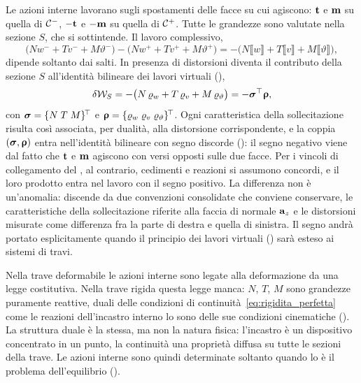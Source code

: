 Le azioni interne lavorano sugli spostamenti delle facce
su cui agiscono: $\mathbf{t}$ e $\mathbf{m}$ su quella di $\mathcal{C}^-$,
$-\mathbf{t}$ e $-\mathbf{m}$ su quella di $\mathcal{C}^+$. Tutte le
grandezze sono valutate nella sezione $S$, che si
sottintende. Il lavoro complessivo,
\begin{equation*}
	\bigl(N w^- + T v^- + M \vartheta^-\bigr)
	- \bigl(N w^+ + T v^+ + M \vartheta^+\bigr)
	= -\bigl(N \llbracket w \rrbracket + T \llbracket v \rrbracket
	+ M \llbracket \vartheta \rrbracket\bigr),
\end{equation*}
dipende soltanto dai salti. In presenza di distorsioni
diventa il contributo della sezione $S$ all'identità
bilineare dei lavori virtuali (),
\begin{equation}\label{eq:lavoro_continuita}
	\delta\mathcal{W}_S =
	-\bigl(N\,\varrho_w + T\,\varrho_v + M\,\varrho_\vartheta\bigr)
	= -\bm{\sigma}^{\top}\bm{\upvarrho},
\end{equation}
con $\bm{\sigma} = \{N\; T\; M\}^{\!\top}$
e $\bm{\upvarrho} = \{\varrho_w\; \varrho_v\; \varrho_\vartheta\}^{\!\top}$.
Ogni caratteristica della sollecitazione risulta così
associata, per dualità, alla distorsione corrispondente,
e la coppia $(\bm{\sigma}, \bm{\upvarrho})$ entra nell'identità
bilineare con segno discorde (): il segno negativo
viene dal fatto che $\mathbf{t}$ e $\mathbf{m}$ agiscono con versi
opposti sulle due facce. Per i vincoli di collegamento
del , al contrario, cedimenti e
reazioni si assumono concordi, e il loro prodotto entra
nel lavoro con il segno positivo. La differenza non è
un'anomalia: discende da due convenzioni consolidate che
conviene conservare, le caratteristiche della
sollecitazione riferite alla faccia di normale $\mathbf{a}_z$
e le distorsioni misurate come differenza fra la parte
di destra e quella di sinistra. Il segno andrà portato
esplicitamente quando il principio dei lavori virtuali
() sarà esteso ai sistemi di travi.



\begin{oss}\label{oss:azioni_interne_reattive}
	Nella trave deformabile le azioni interne sono legate
	alla deformazione da una legge costitutiva. Nella trave
	rigida questa legge manca: $N$, $T$, $M$ sono grandezze
	puramente reattive, duali delle condizioni di
	continuità~\eqref{eq:rigidita_perfetta} come le reazioni
	dell'incastro interno lo sono delle sue condizioni
	cinematiche (). La struttura
	duale è la stessa, ma non la natura fisica: l'incastro
	è un dispositivo concentrato in un punto, la continuità
	una proprietà diffusa su tutte le sezioni della trave.
	Le azioni interne sono quindi determinate soltanto quando lo è il problema
	dell'equilibrio ().
\end{oss}

